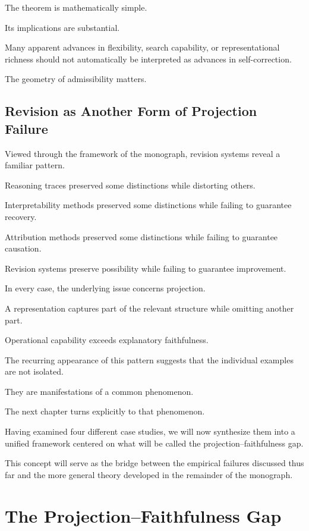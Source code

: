 \documentclass[11pt,oneside,openany]{book}
\begin{document}
The theorem is mathematically simple.

Its implications are substantial.

Many apparent advances in flexibility, search capability, or representational richness should not automatically be interpreted as advances in self-correction.

The geometry of admissibility matters.

\section{Revision as Another Form of Projection Failure}

Viewed through the framework of the monograph, revision systems reveal a familiar pattern.

Reasoning traces preserved some distinctions while distorting others.

Interpretability methods preserved some distinctions while failing to guarantee recovery.

Attribution methods preserved some distinctions while failing to guarantee causation.

Revision systems preserve possibility while failing to guarantee improvement.

In every case, the underlying issue concerns projection.

A representation captures part of the relevant structure while omitting another part.

Operational capability exceeds explanatory faithfulness.

The recurring appearance of this pattern suggests that the individual examples are not isolated.

They are manifestations of a common phenomenon.

The next chapter turns explicitly to that phenomenon.

Having examined four different case studies, we will now synthesize them into a unified framework centered on what will be called the projection--faithfulness gap.

This concept will serve as the bridge between the empirical failures discussed thus far and the more general theory developed in the remainder of the monograph.

\chapter{The Projection--Faithfulness Gap}
\end{document}
